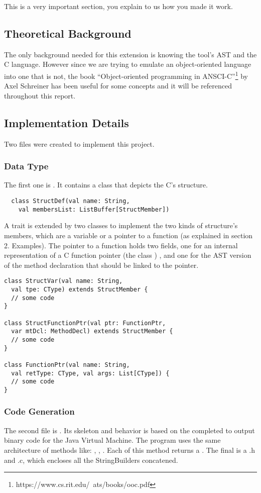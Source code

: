This is a very important section, you explain to us how you made it work.

\subsection{Theoretical Background}
The only background needed for this extension is knowing the tool's AST and the C language. However since we are trying to emulate an object-oriented language into one that is not, the book ``Object-oriented programming in ANSCI-C''\footnote{https://www.cs.rit.edu/~ats/books/ooc.pdf} by Axel Schreiner has been useful for some concepts and it will be referenced throughout this report.

\subsection{Implementation Details}
Two files were created to implement this project.
\subsubsection{Data Type}
The first one is . It contains a class that depicts the C's structure.
\lstset{style=customscala}
\begin{lstlisting}
  class StructDef(val name: String,
    val membersList: ListBuffer[StructMember])
\end{lstlisting}
 A trait  is extended by two classes to implement the two kinds of structure's members,
 which are a variable or a pointer to a function (as explained in section 2. Examples). The pointer to a function holds two fields, one for an internal representation of a C function pointer (the class ) , and one for the AST version of the method declaration that should be linked to the pointer. 

 \begin{lstlisting}
class StructVar(val name: String,
  val tpe: CType) extends StructMember {
  // some code
}

class StructFunctionPtr(val ptr: FunctionPtr,
  var mtDcl: MethodDecl) extends StructMember {
  // some code
}

class FunctionPtr(val name: String,
  val retType: CType, val args: List[CType]) {
  // some code
}
 \end{lstlisting}
 \subsubsection{Code Generation}
The second file is . Its skeleton and behavior is based on the  completed
to output binary code for the Java Virtual Machine.
The program uses the same architecture of methods like: , , .
Each of this method returns a .
\newline
The final is a .h and .c, which encloses all the StringBuilders concatened.
\newline
